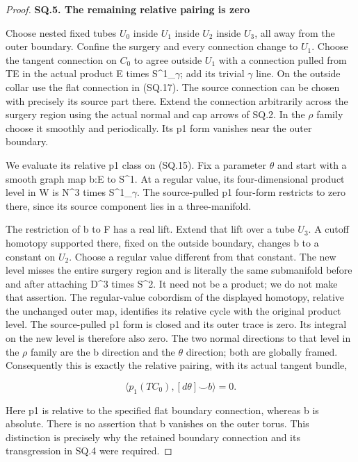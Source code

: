 \begin{proof}
\par

\medskip\noindent\textbf{SQ.5. The remaining relative pairing is zero}

\par\nobreak

Choose nested fixed tubes \(U_{0}\) inside \(U_{1}\) inside \(U_{2}\) inside \(U_{3}\), all away
from the outer boundary. Confine the surgery and every connection change
to \(U_{1}\). Choose the tangent connection on \(C_{0}\) to agree outside \(U_{1}\)
with a connection pulled from TE in the actual product E times
S\^{}1\_\(\gamma\); add its trivial \(\gamma\) line. On the outside collar use
the flat connection in (SQ.17). The source connection can be
chosen with precisely its source part there. Extend the connection
arbitrarily across the surgery region using the actual normal and
cap arrows of SQ.2. In the \(\rho\) family choose it smoothly and
periodically. Its p1 form vanishes near the outer boundary.

We evaluate its relative p1 class on (SQ.15). Fix a parameter \(\theta\)
and start with a smooth graph map b:E to S\^{}1. At a regular value,
its four-dimensional product level in W is N\^{}3 times S\^{}1\_\(\gamma\).
The source-pulled p1 four-form restricts to zero there, since its
source component lies in a three-manifold.

The restriction of b to F has a real lift. Extend that lift over a
tube \(U_{3}\). A cutoff homotopy supported there, fixed on the outside
boundary, changes b to a constant on \(U_{2}\). Choose a regular value
different from that constant. The new level misses the entire
surgery region and is literally the same submanifold before and
after attaching D\^{}3 times S\^{}2. It need not be a product; we do not
make that assertion. The regular-value cobordism of the displayed
homotopy, relative the unchanged outer map, identifies its relative
cycle with the original product level. The source-pulled p1 form is
closed and its outer trace is zero. Its integral on the new level
is therefore also zero. The two normal directions to that level
in the \(\rho\) family are the b direction and the \(\theta\) direction;
both are globally framed. Consequently this is exactly the
relative pairing, with its actual tangent bundle,

\[
              \big\langle p_1(TC_0),[d\theta]\smile b
                         \big\rangle=0.                 \tag{SQ.19}
\]

Here p1 is relative to the specified flat boundary connection,
whereas b is absolute. There is no assertion that b vanishes on
the outer torus. This distinction is precisely why the retained
boundary connection and its transgression in SQ.4 were required.


\end{proof}
